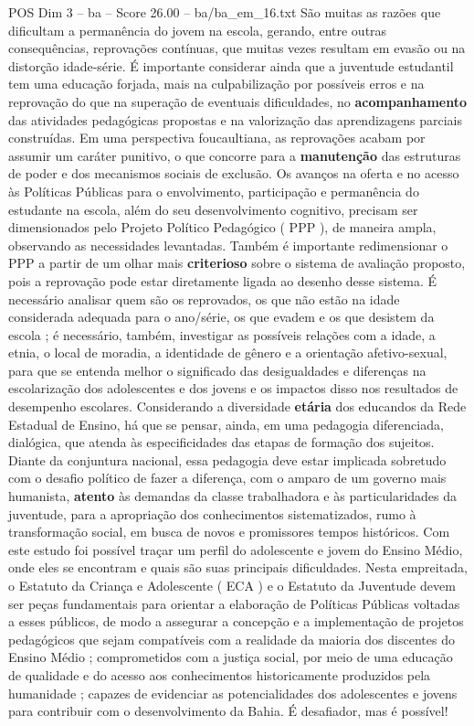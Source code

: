 \begin{textsample}{POS Dim 3 – ba – Score 26.00 – ba/ba\_em\_16.txt}
São muitas as razões que dificultam a permanência do jovem na escola, gerando, entre outras consequências, reprovações contínuas, que muitas vezes resultam em evasão ou na distorção idade-série.
É importante considerar ainda que a juventude estudantil tem uma educação forjada, mais na culpabilização por possíveis erros e na reprovação do que na superação de eventuais dificuldades, no \textbf{acompanhamento} das atividades pedagógicas propostas e na valorização das aprendizagens parciais construídas.
Em uma perspectiva foucaultiana, as reprovações acabam por assumir um caráter punitivo, o que concorre para a \textbf{manutenção} das estruturas de poder e dos mecanismos sociais de exclusão.
Os avanços na oferta e no acesso às Políticas Públicas para o envolvimento, participação e permanência do estudante na escola, além do seu desenvolvimento cognitivo, precisam ser dimensionados pelo Projeto Político Pedagógico ( PPP ), de maneira ampla, observando as necessidades levantadas.
Também é importante redimensionar o PPP a partir de um olhar mais \textbf{criterioso} sobre o sistema de avaliação proposto, pois a reprovação pode estar diretamente ligada ao desenho desse sistema.
É necessário analisar quem são os reprovados, os que não estão na idade considerada adequada para o ano/série, os que evadem e os que desistem da escola ; é necessário, também, investigar as possíveis relações com a idade, a etnia, o local de moradia, a identidade de gênero e a orientação afetivo-sexual, para que se entenda melhor o significado das desigualdades e diferenças na escolarização dos adolescentes e dos jovens e os impactos disso nos resultados de desempenho escolares.
Considerando a diversidade \textbf{etária} dos educandos da Rede Estadual de Ensino, há que se pensar, ainda, em uma pedagogia diferenciada, dialógica, que atenda às especificidades das etapas de formação dos sujeitos.
Diante da conjuntura nacional, essa pedagogia deve estar implicada sobretudo com o desafio político de fazer a diferença, com o amparo de um governo mais humanista, \textbf{atento} às demandas da classe trabalhadora e às particularidades da juventude, para a apropriação dos conhecimentos sistematizados, rumo à transformação social, em busca de novos e promissores tempos históricos.
Com este estudo foi possível traçar um perfil do adolescente e jovem do Ensino Médio, onde eles se encontram e quais são suas principais dificuldades.
Nesta empreitada, o Estatuto da Criança e Adolescente ( ECA ) e o Estatuto da Juventude devem ser peças fundamentais para orientar a elaboração de Políticas Públicas voltadas a esses públicos, de modo a assegurar a concepção e a implementação de projetos pedagógicos que sejam compatíveis com a realidade da maioria dos discentes do Ensino Médio ; comprometidos com a justiça social, por meio de uma educação de qualidade e do acesso aos conhecimentos historicamente produzidos pela humanidade ; capazes de evidenciar as potencialidades dos adolescentes e jovens para contribuir com o desenvolvimento da Bahia.
É desafiador, mas é possível!


\end{textsample}
